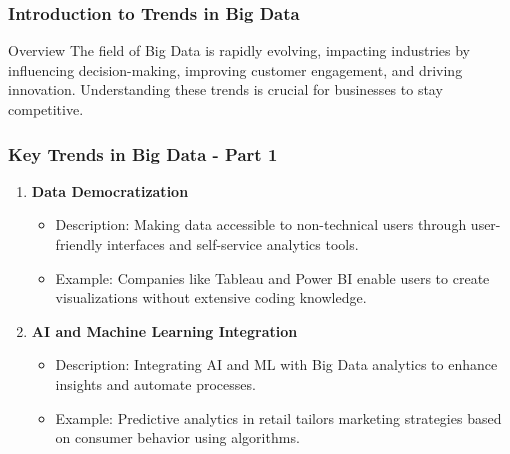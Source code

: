 \documentclass[aspectratio=169]{beamer}
\begin{document}
\frame{\titlepage}

\begin{frame}[fragile]
    \frametitle{Introduction to Trends in Big Data}
    \begin{block}{Overview}
        The field of Big Data is rapidly evolving, impacting industries by influencing decision-making, improving customer engagement, and driving innovation. Understanding these trends is crucial for businesses to stay competitive.
    \end{block}
\end{frame}

\begin{frame}[fragile]
    \frametitle{Key Trends in Big Data - Part 1}
    \begin{enumerate}
        \item \textbf{Data Democratization}
            \begin{itemize}
                \item Description: Making data accessible to non-technical users through user-friendly interfaces and self-service analytics tools.
                \item Example: Companies like Tableau and Power BI enable users to create visualizations without extensive coding knowledge.
            \end{itemize}

        \item \textbf{AI and Machine Learning Integration}
            \begin{itemize}
                \item Description: Integrating AI and ML with Big Data analytics to enhance insights and automate processes.
                \item Example: Predictive analytics in retail tailors marketing strategies based on consumer behavior using algorithms.
            \end{itemize}
    \end{enumerate}
\end{frame}
\end{document}
